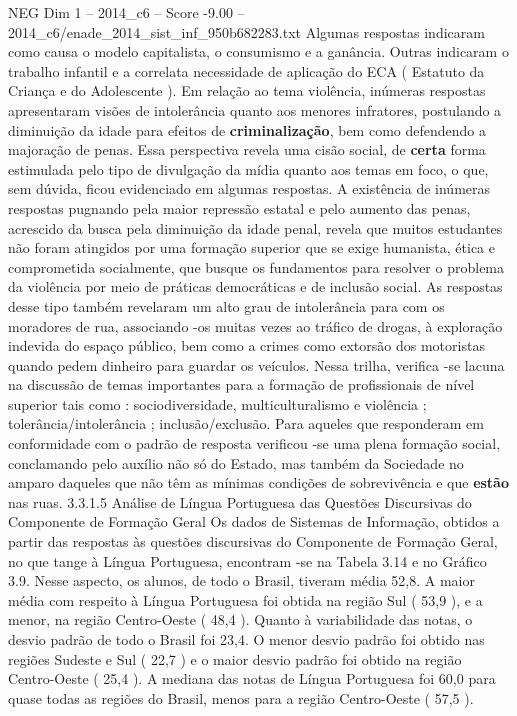 \begin{textsample}{NEG Dim 1 – 2014\_c6 – Score -9.00 – 2014\_c6/enade\_2014\_sist\_inf\_950b682283.txt}
Algumas respostas indicaram como causa o modelo capitalista, o consumismo e a ganância.
Outras indicaram o trabalho infantil e a correlata necessidade de aplicação do ECA ( Estatuto da Criança e do Adolescente ).
Em relação ao tema violência, inúmeras respostas apresentaram visões de intolerância quanto aos menores infratores, postulando a diminuição da idade para efeitos de \textbf{criminalização}, bem como defendendo a majoração de penas.
Essa perspectiva revela uma cisão social, de \textbf{certa} forma estimulada pelo tipo de divulgação da mídia quanto aos temas em foco, o que, sem dúvida, ficou evidenciado em algumas respostas.
A existência de inúmeras respostas pugnando pela maior repressão estatal e pelo aumento das penas, acrescido da busca pela diminuição da idade penal, revela que muitos estudantes não foram atingidos por uma formação superior que se exige humanista, ética e comprometida socialmente, que busque os fundamentos para resolver o problema da violência por meio de práticas democráticas e de inclusão social.
As respostas desse tipo também revelaram um alto grau de intolerância para com os moradores de rua, associando -os muitas vezes ao tráfico de drogas, à exploração indevida do espaço público, bem como a crimes como extorsão dos motoristas quando pedem dinheiro para guardar os veículos.
Nessa trilha, verifica -se lacuna na discussão de temas importantes para a formação de profissionais de nível superior tais como : sociodiversidade, multiculturalismo e violência ; tolerância/intolerância ; inclusão/exclusão.
Para aqueles que responderam em conformidade com o padrão de resposta verificou -se uma plena formação social, conclamando pelo auxílio não só do Estado, mas também da Sociedade no amparo daqueles que não têm as mínimas condições de sobrevivência e que \textbf{estão} nas ruas. 3.3.1.5 Análise de Língua Portuguesa das Questões Discursivas do Componente de Formação Geral Os dados de Sistemas de Informação, obtidos a partir das respostas às questões discursivas do Componente de Formação Geral, no que tange à Língua Portuguesa, encontram -se na Tabela 3.14 e no Gráfico 3.9.
Nesse aspecto, os alunos, de todo o Brasil, tiveram média 52,8.
A maior média com respeito à Língua Portuguesa foi obtida na região Sul ( 53,9 ), e a menor, na região Centro-Oeste ( 48,4 ).
Quanto à variabilidade das notas, o desvio padrão de todo o Brasil foi 23,4.
O menor desvio padrão foi obtido nas regiões Sudeste e Sul ( 22,7 ) e o maior desvio padrão foi obtido na região Centro-Oeste ( 25,4 ).
A mediana das notas de Língua Portuguesa foi 60,0 para quase todas as regiões do Brasil, menos para a região Centro-Oeste ( 57,5 ).

\end{textsample}
